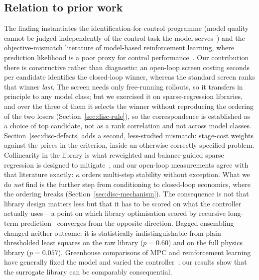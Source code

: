 \subsection{Relation to prior work}
\label{sec:disc-related}

The finding instantiates the identification-for-control programme (model quality cannot be judged independently of the control task the model serves~\cite{gevers1993,vandenhof1995,ljung1999,hjalmarsson2005,controlorientedsurvey2025}) and
the objective-mismatch literature of model-based reinforcement learning, where
prediction likelihood is a poor proxy for control
performance~\cite{lambert2020,wei2024,farahmand2017,jackson2022}. Our
contribution there is constructive rather than diagnostic: an open-loop screen
costing seconds per candidate identifies the closed-loop winner, whereas the
standard screen ranks that winner \emph{last}. The screen needs only free-running
rollouts, so it transfers in principle to any model class; but we exercised it on
sparse-regression libraries, and over the three of them it selects the winner
without reproducing the ordering of the two losers
(Section~\ref{sec:disc-rule}), so the correspondence is established as a choice of
top candidate, not as a rank correlation and not across model classes.
Section~\ref{sec:disc-defects} adds a second, less-studied mismatch: stage-cost
weights against the prices in the criterion, inside an otherwise correctly
specified problem. Collinearity in the library is what reweighted and
balance-guided sparse regression is designed to
mitigate~\cite{cortiella2021,balanceguided2026,belsley1980}, and our open-loop
measurements agree with that literature exactly: $\kappa$ orders multi-step
stability without exception. What we do \emph{not} find is the further step from
conditioning to closed-loop economics, where the ordering breaks
(Section~\ref{sec:disc-mechanism}). The consequence is not that library design
matters less but that it has to be scored on what the controller actually uses -- a
point on which library optimisation scored by recursive long-term
prediction~\cite{yonezawa2026} converges from the opposite direction. Bagged
ensembling~\cite{fasel2022} changed neither outcome: it is statistically
indistinguishable from plain thresholded least squares on the raw library
($p=0.60$) and on the full physics library ($p=0.057$).
Greenhouse comparisons of MPC and reinforcement learning have generally fixed the model
and varied the controller~\cite{morcego2023,mallick2025,vanlaatum2025,lin2021}; our
results show that the surrogate library can be comparably consequential.

